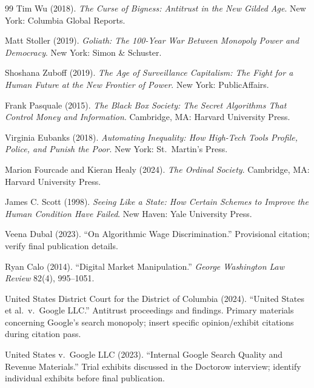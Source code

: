 \documentclass[11pt]{article}
\begin{document}
\begin{thebibliography}{99}
Tim Wu (2018). \emph{The Curse of Bigness: Antitrust in the New Gilded Age}. New York: Columbia Global Reports.

Matt Stoller (2019). \emph{Goliath: The 100-Year War Between Monopoly Power and Democracy}. New York: Simon \& Schuster.

Shoshana Zuboff (2019). \emph{The Age of Surveillance Capitalism: The Fight for a Human Future at the New Frontier of Power}. New York: PublicAffairs.

Frank Pasquale (2015). \emph{The Black Box Society: The Secret Algorithms That Control Money and Information}. Cambridge, MA: Harvard University Press.

Virginia Eubanks (2018). \emph{Automating Inequality: How High-Tech Tools Profile, Police, and Punish the Poor}. New York: St.\ Martin's Press.

Marion Fourcade and Kieran Healy (2024). \emph{The Ordinal Society}. Cambridge, MA: Harvard University Press.

James C. Scott (1998). \emph{Seeing Like a State: How Certain Schemes to Improve the Human Condition Have Failed}. New Haven: Yale University Press.

Veena Dubal (2023). ``On Algorithmic Wage Discrimination.'' Provisional citation; verify final publication details.

Ryan Calo (2014). ``Digital Market Manipulation.'' \emph{George Washington Law Review} 82(4), 995--1051.

United States District Court for the District of Columbia (2024). ``United States et al.\ v.\ Google LLC.'' Antitrust proceedings and findings. Primary materials concerning Google's search monopoly; insert specific opinion/exhibit citations during citation pass.

United States v.\ Google LLC (2023). ``Internal Google Search Quality and Revenue Materials.'' Trial exhibits discussed in the Doctorow interview; identify individual exhibits before final publication.


\end{thebibliography}
\end{document}
